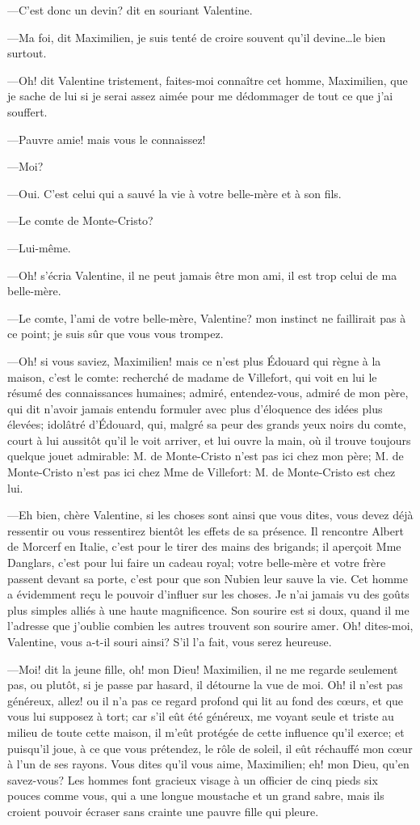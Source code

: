 —C'est donc un devin? dit en souriant Valentine. 

—Ma foi, dit Maximilien, je suis tenté de croire souvent qu'il devine\dots le bien surtout. 

—Oh! dit Valentine tristement, faites-moi connaître cet homme, Maximilien, que je sache de lui si je serai assez aimée pour me dédommager de tout ce que j'ai souffert. 

—Pauvre amie! mais vous le connaissez! 

—Moi? 

—Oui. C'est celui qui a sauvé la vie à votre belle-mère et à son fils. 

—Le comte de Monte-Cristo? 

—Lui-même. 

—Oh! s'écria Valentine, il ne peut jamais être mon ami, il est trop celui de ma belle-mère. 

—Le comte, l'ami de votre belle-mère, Valentine? mon instinct ne faillirait pas à ce point; je suis sûr que vous vous trompez. 

—Oh! si vous saviez, Maximilien! mais ce n'est plus Édouard qui règne à la maison, c'est le comte: recherché de madame de Villefort, qui voit en lui le résumé des connaissances humaines; admiré, entendez-vous, admiré de mon père, qui dit n'avoir jamais entendu formuler avec plus d'éloquence des idées plus élevées; idolâtré d'Édouard, qui, malgré sa peur des grands yeux noirs du comte, court à lui aussitôt qu'il le voit arriver, et lui ouvre la main, où il trouve toujours quelque jouet admirable: M. de Monte-Cristo n'est pas ici chez mon père; M. de Monte-Cristo n'est pas ici chez Mme de Villefort: M. de Monte-Cristo est chez lui. 

—Eh bien, chère Valentine, si les choses sont ainsi que vous dites, vous devez déjà ressentir ou vous ressentirez bientôt les effets de sa présence. Il rencontre Albert de Morcerf en Italie, c'est pour le tirer des mains des brigands; il aperçoit Mme Danglars, c'est pour lui faire un cadeau royal; votre belle-mère et votre frère passent devant sa porte, c'est pour que son Nubien leur sauve la vie. Cet homme a évidemment reçu le pouvoir d'influer sur les choses. Je n'ai jamais vu des goûts plus simples alliés à une haute magnificence. Son sourire est si doux, quand il me l'adresse que j'oublie combien les autres trouvent son sourire amer. Oh! dites-moi, Valentine, vous a-t-il souri ainsi? S'il l'a fait, vous serez heureuse. 

—Moi! dit la jeune fille, oh! mon Dieu! Maximilien, il ne me regarde seulement pas, ou plutôt, si je passe par hasard, il détourne la vue de moi. Oh! il n'est pas généreux, allez! ou il n'a pas ce regard profond qui lit au fond des cœurs, et que vous lui supposez à tort; car s'il eût été généreux, me voyant seule et triste au milieu de toute cette maison, il m'eût protégée de cette influence qu'il exerce; et puisqu'il joue, à ce que vous prétendez, le rôle de soleil, il eût réchauffé mon cœur à l'un de ses rayons. Vous dites qu'il vous aime, Maximilien; eh! mon Dieu, qu'en savez-vous? Les hommes font gracieux visage à un officier de cinq pieds six pouces comme vous, qui a une longue moustache et un grand sabre, mais ils croient pouvoir écraser sans crainte une pauvre fille qui pleure. 


